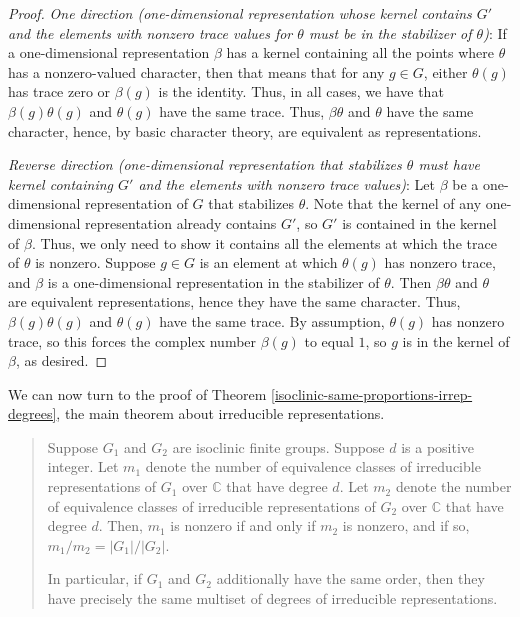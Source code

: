 \begin{proof}
  {\em One direction (one-dimensional representation whose kernel
    contains $G'$ and the elements with nonzero trace values for
    $\theta$ must be in the stabilizer of $\theta$)}: If a
  one-dimensional representation $\beta$ has a kernel containing all
  the points where $\theta$ has a nonzero-valued character, then that
  means that for any $g \in G$, either $\theta(g)$ has trace zero or
  $\beta(g)$ is the identity. Thus, in all cases, we have that
  $\beta(g)\theta(g)$ and $\theta(g)$ have the same trace. Thus,
  $\beta\theta$ and $\theta$ have the same character, hence, by basic
  character theory, are equivalent as representations.

  {\em Reverse direction (one-dimensional representation that
    stabilizes $\theta$ must have kernel containing $G'$ and the
    elements with nonzero trace values)}: Let $\beta$ be a
  one-dimensional representation of $G$ that stabilizes $\theta$. Note
  that the kernel of any one-dimensional representation already
  contains $G'$, so $G'$ is contained in the kernel of $\beta$. Thus,
  we only need to show it contains all the elements at which the trace
  of $\theta$ is nonzero. Suppose $g \in G$ is an element at which
  $\theta(g)$ has nonzero trace, and $\beta$ is a one-dimensional
  representation in the stabilizer of $\theta$. Then $\beta \theta$
  and $\theta$ are equivalent representations, hence they have the
  same character. Thus, $\beta(g)\theta(g)$ and $\theta(g)$ have the
  same trace. By assumption, $\theta(g)$ has nonzero trace, so this
  forces the complex number $\beta(g)$ to equal $1$, so $g$ is in the
  kernel of $\beta$, as desired.
\end{proof}

We can now turn to the proof of Theorem
\ref{isoclinic-same-proportions-irrep-degrees}, the main theorem about
irreducible representations.

\begin{quote}
  Suppose $G_1$ and $G_2$ are isoclinic finite groups. Suppose $d$ is
  a positive integer. Let $m_1$ denote the number of equivalence
  classes of irreducible representations of $G_1$ over $\mathbb{C}$
  that have degree $d$. Let $m_2$ denote the number of equivalence
  classes of irreducible representations of $G_2$ over $\mathbb{C}$
  that have degree $d$. Then, $m_1$ is nonzero if and only if $m_2$ is
  nonzero, and if so, $m_1/m_2 = |G_1|/|G_2|$.

  In particular, if $G_1$ and $G_2$ additionally have the same order,
  then they have precisely the same multiset of degrees of irreducible
  representations.
\end{quote}

